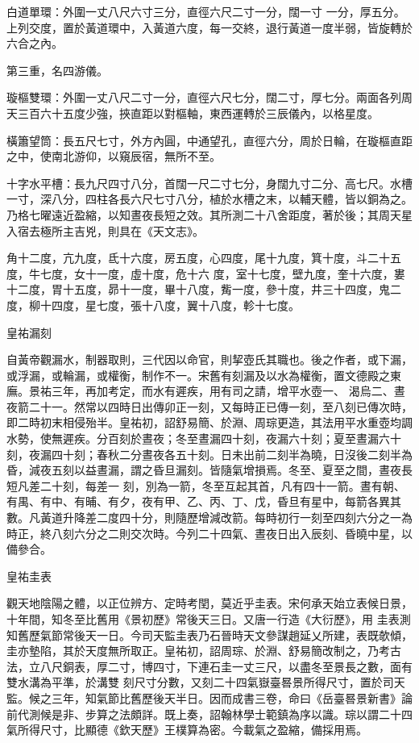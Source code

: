 \begin{pinyinscope}
 白道單環：外圍一丈八尺六寸三分，直徑六尺二寸一分，闊一寸
 一分，厚五分。上列交度，置於黃道環中，入黃道六度，每一交終，退行黃道一度半弱，皆旋轉於六合之內。



 第三重，名四游儀。



 璇樞雙環：外圍一丈八尺二寸一分，直徑六尺七分，闊二寸，厚七分。兩面各列周天三百六十五度少強，挾直距以對樞軸，東西運轉於三辰儀內，以格星度。



 橫簫望筒：長五尺七寸，外方內圓，中通望孔，直徑六分，周於日輪，在璇樞直距之中，使南北游仰，以窺辰宿，無所不至。



 十字水平槽：長九尺四寸八分，首闊一尺二寸七分，身闊九寸二分、高七尺。水槽一寸，深八分，四柱各長六尺七寸八分，植於水槽之末，以輔天體，皆以銅為之。乃格七曜遠近盈縮，以知晝夜長短之效。其所測二十八舍距度，著於後；其周天星入宿去極所主吉兇，則具在《天文志》。



 角十二度，亢九度，氐十六度，房五度，心四度，尾十九度，箕十度，斗二十五度，牛七度，女十一度，虛十度，危十六
 度，室十七度，壁九度，奎十六度，婁十二度，胃十五度，昴十一度，畢十八度，觜一度，參十度，井三十四度，鬼二度，柳十四度，星七度，張十八度，翼十八度，軫十七度。



 皇祐漏刻



 自黃帝觀漏水，制器取則，三代因以命官，則挈壺氏其職也。後之作者，或下漏，或浮漏，或輪漏，或權衡，制作不一。宋舊有刻漏及以水為權衡，置文德殿之東廡。景祐三年，再加考定，而水有遲疾，用有司之請，增平水壺一、
 渴烏二、晝夜箭二十一。然常以四時日出傳卯正一刻，又每時正已傳一刻，至八刻已傳次時，即二時初末相侵殆半。皇祐初，詔舒易簡、於淵、周琮更造，其法用平水重壺均調水勢，使無遲疾。分百刻於晝夜；冬至晝漏四十刻，夜漏六十刻；夏至晝漏六十刻，夜漏四十刻；春秋二分晝夜各五十刻。日未出前二刻半為曉，日沒後二刻半為昏，減夜五刻以益晝漏，謂之昏旦漏刻。皆隨氣增損焉。冬至、夏至之間，晝夜長短凡差二十刻，每差一
 刻，別為一箭，冬至互起其首，凡有四十一箭。晝有朝、有禺、有中、有晡、有夕，夜有甲、乙、丙、丁、戊，昏旦有星中，每箭各異其數。凡黃道升降差二度四十分，則隨歷增減改箭。每時初行一刻至四刻六分之一為時正，終八刻六分之二則交次時。今列二十四氣、晝夜日出入辰刻、昏曉中星，以備參合。



 皇祐圭表



 觀天地陰陽之體，以正位辨方、定時考閏，莫近乎圭表。宋何承天始立表候日景，十年間，知冬至比舊用《景初歷》常後天三日。又唐一行造《大衍歷》，用
 圭表測知舊歷氣節常後天一日。今司天監圭表乃石晉時天文參謀趙延乂所建，表既欹傾，圭亦墊陷，其於天度無所取正。皇祐初，詔周琮、於淵、舒易簡改制之，乃考古法，立八尺銅表，厚二寸，博四寸，下連石圭一丈三尺，以盡冬至景長之數，面有雙水溝為平準，於溝雙
 刻尺寸分數，又刻二十四氣嶽臺晷景所得尺寸，置於司天監。候之三年，知氣節比舊歷後天半日。因而成書三卷，命曰《岳臺晷景新書》論前代測候是非、步算之法頗詳。既上奏，詔翰林學士範鎮為序以識。琮以謂二十四氣所得尺寸，比顯德《欽天歷》王樸算為密。今載氣之盈縮，備採用焉。




\end{pinyinscope}
